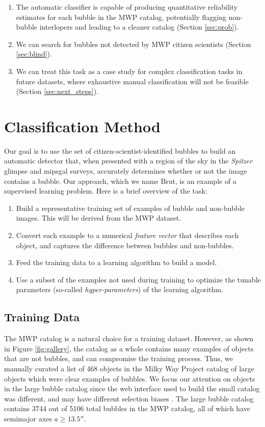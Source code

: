 \documentclass[preprint]{aastex}
\begin{document}
\begin{enumerate}
\item The automatic classifier is capable of producing quantitative reliability estimates for each bubble in the MWP catalog, potentially flagging non-bubble interlopers and leading to a cleaner catalog (Section \ref{sec:prob}).

\item We can search for bubbles not detected by MWP citizen scientists (Section \ref{sec:blind}). 

\item We can treat this task as a case study for complex classification tasks in future datasets, where exhaustive manual classification will not be feasible (Section \ref{sec:next_steps}).
\end{enumerate}

\section{Classification Method}
\label{sec:method}

Our goal is to use the set of citizen-scientist-identified bubbles to build an automatic detector that, when presented with a region of the sky in the \textit{Spitzer} {\sc glimpse} and {\sc mipsgal} surveys, accurately determines whether or not the image contains a bubble. Our approach, which we name Brut, is an example of a supervised learning problem. Here is a brief overview of the task:

\begin{enumerate}
\item Build a representative training set of examples of bubble and non-bubble images. This will be derived from the MWP dataset.
\item Convert each example to a numerical \textit{feature vector} that describes each object, and captures the difference between bubbles and non-bubbles.
\item Feed the training data to a learning algorithm to build a model.
\item Use a subset of the examples not used during training to optimize the tunable parameters (so-called \textit{hyper-parameters}) of the learning algorithm.
\end{enumerate}

\subsection{Training Data}
\label{sec:method_training_data}
The MWP catalog is a natural choice for a training dataset. However, as shown in Figure \ref{fig:gallery}, the catalog as a whole contains many examples of objects that are not bubbles, and can compromise the training process. Thus, we manually curated a list of 468 objects in the Milky Way Project catalog of large objects which were clear examples of bubbles. We focus our attention on objects in the large bubble catalog since the web interface used to build the small catalog was different, and may have different selection biases \citep{Simpson12}. The large bubble catalog contains 3744 out of 5106 total bubbles in the MWP catalog, all of which have semimajor axes $a \geq 13.5''$.
\end{document}
